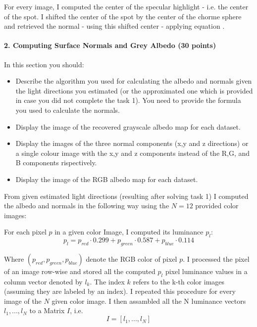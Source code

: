\documentclass{paper}
\begin{document}
For every image, I computed the center of the specular highlight - i.e. the center of the spot. I shifted the center of the spot by the center of the chorme sphere and retrieved the normal - using this shifted center - applying equation $\label{eq:final_normal}$.


\paragraph{2. Computing Surface Normals and Grey Albedo (30 points)}

In this section you should:

\begin{itemize}
\item Describe the algorithm you used for calculating the albedo and normals given the light directions you estimated (or the approximated one which is provided in case you did not complete the task 1). You need to provide the formula you used to calculate the normals.

\item Display the image of the recovered grayscale albedo map for each dataset.
\item Display the images of the three normal components (x,y and z directions) or a single colour image with the x,y and z components instead of the R,G, and B components rispectively.
\item Display the image of the RGB albedo map for each dataset. 
\end{itemize}

From given estimated light directions (resulting after solving task 1) I computed the albedo and normals in the following way using the $N=12$ provided color images: 

For each pixel $p$ in a given color Image, I computed its luminance $p_l$:
\begin{equation}
    p_l = p_{red}\cdot 0.299 + p_{green} \cdot 0.587 + p_{blue} \cdot 0.114 
\label{eq:liminance}
\end{equation}

Where $(p_{red}, p_{green}, p_{blue})$ denote the RGB color of pixel $p$. I processed the pixel of an image row-wise and stored all the computed $p_l$ pixel luminance values in a column vector denoted by $l_k$. The index $k$ refers to the k-th color images (assuming they are labeled by an index). I repeated this procedure for every image of the $N$ given color image. I then assambled all the N luminance vectors $l_1, ..., l_N$ to a Matrix $I$, i.e. 
\begin{equation}
    I = \left[l_1,...,l_N\right]
\label{eq:lum_mat}
\end{equation}
\end{document}
